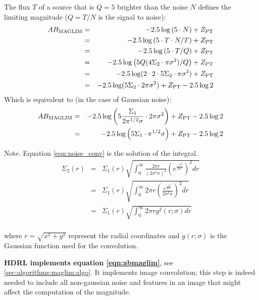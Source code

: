 The flux $T$ of a source that is $Q=5$ brighter than the noise $N$
defines the limiting magnitude ($Q=T/N$ is the signal to noise):
\begin{eqnarray}
AB_{\rm MAGLIM} &=& -2.5\log\left( 5\cdot N  \right) +Z_{\rm PT}  \nonumber\\
            &=& -2.5\log\left( 5\cdot T \cdot N/T \right)  +Z_{\rm PT}  \nonumber\\
            &=& -2.5\log\left( 5\cdot T/Q \right)  +Z_{\rm PT}  \nonumber\\
            &=& -2.5\log\left( 5Q(4 \Sigma_2 \cdot \pi \sigma^2 )/Q \right)  +Z_{\rm PT} \nonumber\\
            &=& -2.5\log (2\cdot 2\cdot 5 \Sigma_2 \cdot \pi \sigma^2 )  +Z_{\rm PT} \nonumber\\
            &=& -2.5\log ( 5 \Sigma_2 \cdot 2 \pi \sigma^2 ) +Z_{\rm PT} -2.5\log 2
\label{eqn:abmaglim}
\end{eqnarray}
Which is equivalent to (in the case of Gaussian noise):
\begin{eqnarray}
AB_{\rm MAGLIM} &=& -2.5\log \left( 5   \frac{ \Sigma_1}{ 2\pi^{1/2}\sigma} \cdot 2 \pi \sigma^2 \right) +Z_{\rm PT} -2.5\log 2  \nonumber\\
 &=& -2.5\log \left( 5  \Sigma_1 \cdot \pi^{1/2} \sigma \right) +Z_{\rm PT} -2.5\log 2 
\end{eqnarray}

Note. Equation \ref{eqn:noise_conv}  is the solution of the integral.
\begin{eqnarray}
\Sigma_2 (r)&=& \Sigma_1(r)\sqrt{\int_0^{\infty}{ \frac{2\pi r}{(2\sigma^2\pi)^2} \left( e^{\frac{-r^2}{2\sigma^2}} \right)^2  dr} } \nonumber\\
            &=& \Sigma_1(r)\sqrt{\int_0^{\infty}{ 2\pi r \left( \frac{e^{\frac{-r^2}{2\sigma^2}}}{2\sigma^2\pi} \right)^2  dr} } \nonumber\\
            &=& \Sigma_1(r)\sqrt{\int_0^{\infty}{ 2\pi r  g^2(r;\sigma)  dr} } \nonumber\\
\end{eqnarray}

where $r=\sqrt{x^2+y^2}$ represent the radial coordinates and $g(r;\sigma)$ is the Gaussian function used for the convolution.

{\bf HDRL implements equation \ref{eqn:abmaglim}}, see \ref{sec:algorithms:maglim:algo}. It implements image
convolution; this step is indeed needed to include all non-gaussian noise and
features in an image that might affect the computation of the
magnitude.
